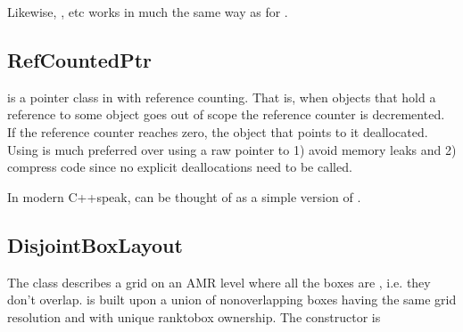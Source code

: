 \documentclass[letterpaper,10pt,english]{sphinxmanual}
\begin{document}
\begin{sphinxVerbatim}[commandchars=\\\{\},formatcom=\scriptsize]
  

   \PYG{p}{[}\PYG{p}{]}
\end{sphinxVerbatim}

Likewise, ,  etc works in much the same way as for .


\subsection{RefCountedPtr}
\label{\detokenize{Source/ChomboBasics:refcountedptr}}
 is a pointer class in  with reference counting.
That is, when objects that hold a reference to some  object goes out of scope the reference counter is decremented.
If the reference counter reaches zero, the object that  points to it deallocated.
Using  is much preferred over using a raw pointer  to 1) avoid memory leaks and 2) compress code since no explicit deallocations need to be called.

In modern C++\sphinxhyphen{}speak,  can be thought of as a  simple version of .


\subsection{DisjointBoxLayout}
\label{\detokenize{Source/ChomboBasics:disjointboxlayout}}
The  class describes a grid on an AMR level where all the boxes are , i.e. they don’t overlap.
 is built upon a union of non\sphinxhyphen{}overlapping boxes having the same grid resolution and with unique rank\sphinxhyphen{}to\sphinxhyphen{}box ownership.
The constructor is
\end{document}
